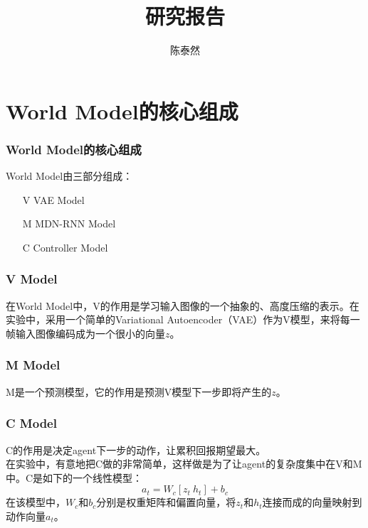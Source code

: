 \documentclass{beamer}
\title{研究报告}
\author{陈泰然}
\institute{USTC nelslip}
\begin{document}
	\frame{\titlepage}
	
	
	
	\section{World Model的核心组成}
	
	\begin{frame}
		\frametitle{World Model的核心组成}
		World Model由三部分组成：
		\begin{itemize}
			\item[V] VAE Model
			\item[M] MDN-RNN Model
			\item[C] Controller Model
		\end{itemize}
	\end{frame}
	
	\begin{frame}
		\frametitle{V Model}
		在World Model中，V的作用是学习输入图像的一个抽象的、高度压缩的表示。在实验中，采用一个简单的Variational Autoencoder（VAE）作为V模型，来将每一帧输入图像编码成为一个很小的向量$z$。
	\end{frame}

	\begin{frame}
		\frametitle{M Model}
		M是一个预测模型，它的作用是预测V模型下一步即将产生的$z$。
	\end{frame}
	
	\begin{frame}
		\frametitle{C Model}
		C的作用是决定agent下一步的动作，让累积回报期望最大。\\
		在实验中，有意地把C做的非常简单，这样做是为了让agent的复杂度集中在V和M中。C是如下的一个线性模型：
		\begin{equation}
			a_t=W_c[z_t\ h_t]+b_c
		\end{equation}
		在该模型中，$W_c$和$b_c$分别是权重矩阵和偏置向量，将$z_t$和$h_t$连接而成的向量映射到动作向量$a_t$。
	\end{frame}
\end{document}
